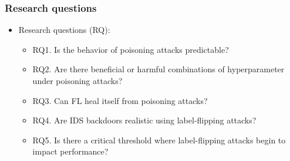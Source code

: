 \documentclass[color,t,presentation,english,aspectratio=169]{beamer}
\begin{document}
\begin{frame}
	\frametitle{Research questions}
	\begin{itemize}
		\item Research questions (RQ):
    \begin{itemize}
			\item RQ1. Is the behavior of poisoning attacks predictable?
			\item RQ2. Are there beneficial or harmful combinations of hyperparameter under poisoning attacks?
			\item RQ3. Can FL heal itself from poisoning attacks?
			\item RQ4. Are IDS backdoors realistic using label-flipping attacks?
			\item RQ5. Is there a critical threshold where label-flipping attacks begin to impact performance?
    \end{itemize}
	\end{itemize}
\end{frame}
\end{document}
